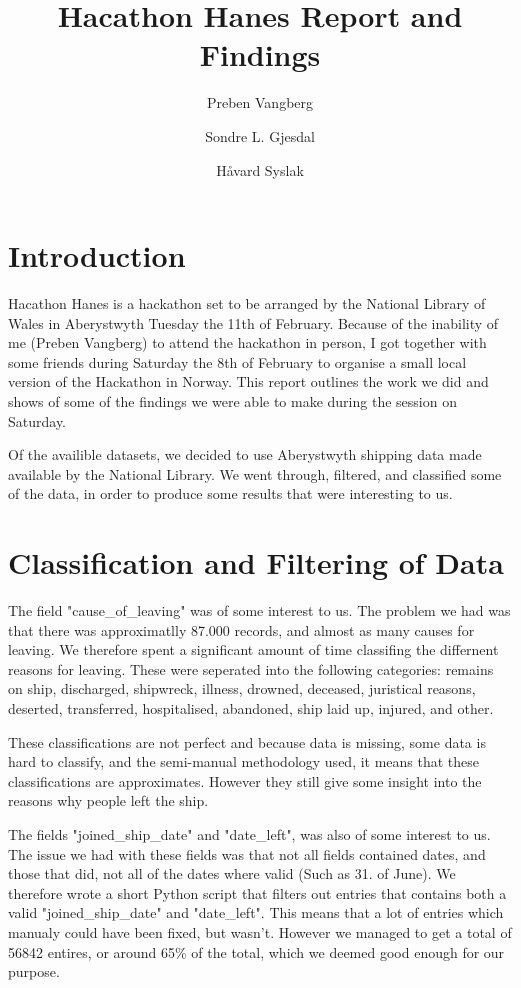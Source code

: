 \documentclass{article}
\author[1,3]{Preben Vangberg}
\author[2]{Sondre L. Gjesdal}
\author[3]{Håvard Syslak}
\affil[1]{Department of Computer Science, Aberystwyth University, Wales}
\affil[2]{Western Norway University of Applied Sciences, Norway}
\affil[3]{MMP PM MON MAIN AUT, Equinor ASA, Norway}
\title{Hacathon Hanes Report and Findings}
\begin{document}
\maketitle
\newpage

\section{Introduction}

Hacathon Hanes is a hackathon set to be arranged by the National Library of Wales in Aberystwyth Tuesday the 11th of February.
Because of the inability of me (Preben Vangberg) to attend the hackathon in person, I got together with some friends during Saturday the 8th of February to organise a small local version of the Hackathon in Norway.
This report outlines the work we did and shows of some of the findings we were able to make during the session on Saturday.

Of the availible datasets, we decided to use Aberystwyth shipping data made available by the National Library.
We went through, filtered, and classified some of the data, in order to produce some results that were interesting to us.

\section{Classification and Filtering of Data}

The field "cause\_of\_leaving" was of some interest to us. The problem we had was that there was approximatlly 87.000 records, and almost as many causes for leaving. 
We therefore spent a significant amount of time classifing the differnent reasons for leaving. These were seperated into the following categories: remains on ship, discharged, shipwreck, illness, drowned, deceased, juristical reasons, deserted, transferred, hospitalised, abandoned, ship laid up, injured, and other. 

These classifications are not perfect and because data is missing, some data is hard to classify, and the semi-manual methodology used, it means that these classifications are approximates. However they still give some insight into the reasons why people left the ship.

The fields "joined\_ship\_date" and "date\_left", was also of some interest to us.
The issue we had with these fields was that not all fields contained dates, and those that did, not all of the dates where valid (Such as 31. of June).
We therefore wrote a short Python script that filters out entries that contains both a valid "joined\_ship\_date" and "date\_left". This means that a lot of entries which manualy could have been fixed, but wasn't. However we managed to get a total of 56842 entires, or around 65\% of the total, which we deemed good enough for our purpose.
\end{document}
